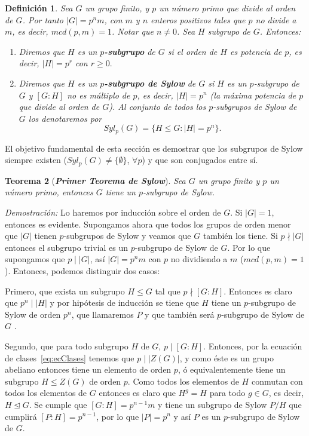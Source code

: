 \documentclass[12pt]{article}
\newtheorem{theorem}{Teorema}[section]
\newtheorem{definition}[theorem]{Definición}
\begin{document}
\begin{definition} Sea $G$ un grupo finito, y $p$ un número primo que divide al orden de $G$. Por tanto $|G| = p^{n}m$, con $m$ y $n$ enteros positivos tales que $p$ no divide a $m$, es decir, $mcd(p,m)=1$. Notar que $n\neq0$. Sea $H$ subgrupo de $G$. Entonces:
\begin{enumerate}
\item Diremos que $H$ es un \textbf{$p$-subgrupo} de $G$ si el orden de $H$ es potencia de $p$, es decir, $|H| = p^{r}$ con $r \geq 0.$
\item Diremos que $H$ es un \textbf{$p$-subgrupo de Sylow} de $G$ si $H$ es un $p$-subgrupo de $G$ y $\left[ G:H \right]$ no es múltiplo de $p$, es decir, $|H| = p^{n}$ (la máxima potencia de $p$ que divide al orden de $G$). Al conjunto de todos los $p$-subgrupos de Sylow de $G$ los denotaremos por $$Syl_{p}(G) = \lbrace H \leq G : |H| = p^{n} \rbrace.$$
\end{enumerate}
\end{definition}

El objetivo fundamental de esta sección es demostrar que los subgrupos de Sylow siempre existen ($Syl_{p}(G) \neq \lbrace \emptyset \rbrace$, $\forall p$) y que son conjugados entre sí. 

\begin{theorem}[\textit{\textbf{Primer Teorema de Sylow}}]
Sea $G$ un grupo finito y $p$ un número primo, entonces $G$ tiene un $p$-subgrupo de Sylow.
\end{theorem}
\emph{Demostración: }Lo haremos por inducción sobre el orden de $G$. Si $|G| = 1$, entonces es evidente. Supongamos ahora que todos los grupos de orden menor que $|G|$ tienen $p$-subgrupos de Sylow y veamos que $G$ también los tiene.
Si $p \nmid |G|$ entonces el subgrupo trivial es un $p$-subgrupo de Sylow de $G$. Por lo que supongamos que $p \mid |G|$, así $|G| = p^{n}m$ con $p$ no dividiendo a $m$ ($mcd(p,m)=1$). Entonces, podemos distinguir dos casos: 

Primero, que exista un subgrupo $H \leq G$ tal que $p \nmid [G:H]$. Entonces es claro que $p^{n} \mid |H|$ y por hipótesis de inducción se tiene que $H$ tiene un $p$-subgrupo de Sylow de orden $p^{n}$, que llamaremos $P$ y que también será $p$-subgrupo de Sylow de $G$ .

Segundo, que para todo subgrupo $H$ de $G$, $p \mid [G:H]$. Entonces, por la ecuación de clases~\ref{eq:ecClases} tenemos que $p \mid |Z(G)|$, y como éste es un grupo abeliano entonces tiene un elemento de orden $p$, ó equivalentemente tiene un subgrupo $H \leq Z(G)$ de orden $p$. Como todos los elementos de $H$ conmutan con todos los elementos de $G$ entonces es claro que $H^{g} = H$ para todo $g \in G$, es decir, $H \unlhd G$. Se cumple que $[G:H] = p^{n-1}m$ y tiene un subgrupo de Sylow $P/H$ que cumplirá $[P:H] = p^{n-1}$, por lo que $|P| = p^{n}$ y así $P$ es un $p$-subgrupo de Sylow de $G$.
\end{document}
